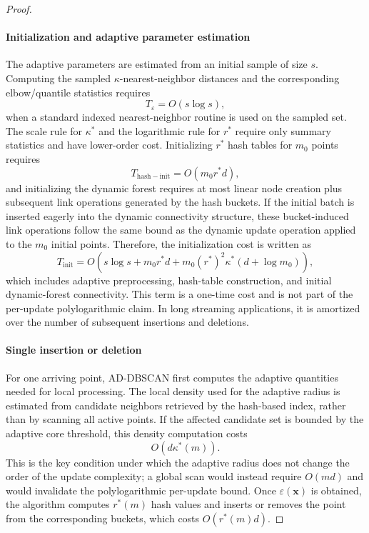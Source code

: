 \documentclass[preprint,12pt,authoryear]{elsarticle}
\theoremstyle{definition}
\begin{document}
\begin{proof}
\paragraph{Initialization and adaptive parameter estimation}
The adaptive parameters are estimated from an initial sample of size $s$. Computing the sampled $\kappa$-nearest-neighbor distances and the corresponding elbow/quantile statistics requires
\begin{equation}
T_{\varepsilon}=O(s\log s),
\end{equation}
when a standard indexed nearest-neighbor routine is used on the sampled set. The scale rule for $\kappa^*$ and the logarithmic rule for $r^*$ require only summary statistics and have lower-order cost. Initializing $r^*$ hash tables for $m_0$ points requires
\begin{equation}
T_{\mathrm{hash-init}}=O(m_0 r^* d),
\end{equation}
and initializing the dynamic forest requires at most linear node creation plus subsequent link operations generated by the hash buckets. If the initial batch is inserted eagerly into the dynamic connectivity structure, these bucket-induced link operations follow the same bound as the dynamic update operation applied to the $m_0$ initial points. Therefore, the initialization cost is written as
\begin{equation}
T_{\mathrm{init}}=O\!\left(s\log s+m_0 r^* d+m_0(r^*)^2\kappa^*(d+\log m_0)\right),
\end{equation}
which includes adaptive preprocessing, hash-table construction, and initial dynamic-forest connectivity. This term is a one-time cost and is not part of the per-update polylogarithmic claim. In long streaming applications, it is amortized over the number of subsequent insertions and deletions.

\paragraph{Single insertion or deletion}
For one arriving point, AD-DBSCAN first computes the adaptive quantities needed for local processing. The local density used for the adaptive radius is estimated from candidate neighbors retrieved by the hash-based index, rather than by scanning all active points. If the affected candidate set is bounded by the adaptive core threshold, this density computation costs
\begin{equation}
O(d\kappa^*(m)).
\end{equation}
This is the key condition under which the adaptive radius does not change the order of the update complexity; a global scan would instead require $O(md)$ and would invalidate the polylogarithmic per-update bound. Once $\varepsilon(\bm{x})$ is obtained, the algorithm computes $r^*(m)$ hash values and inserts or removes the point from the corresponding buckets, which costs $O(r^*(m)d)$.


\end{proof}
\end{document}
